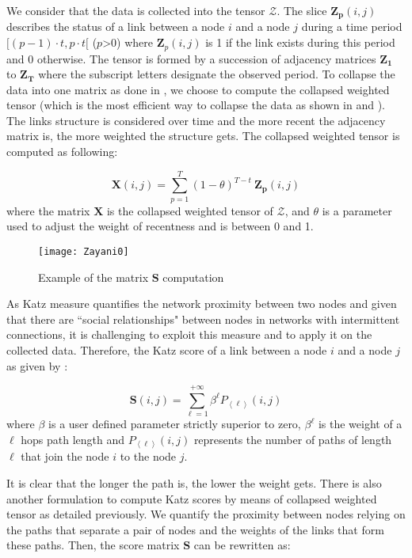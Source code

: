 \documentclass[conference]{IEEEtran}
\begin{document}
We consider that the data is collected into the tensor
$\boldsymbol{\mathcal{Z}}$. The slice $\mathbf{Z_{p}}(i, j)$
describes the status of a link between a node $i$ and a node $j$
during a time period $[(p-1) \cdot t,p \cdot t[$ ($p$>0) where
$\mathbf{Z}_{p}(i, j)$ is 1 if the link exists during this period
and 0 otherwise. The tensor is formed by a succession of adjacency
matrices $\mathbf{Z_{1}}$ to $\mathbf{Z_{T}}$ where the subscript
letters designate the observed period. To collapse the data into one
matrix as done in \cite{Acar2009,Dunlavy2011}, we choose to compute
the collapsed weighted tensor (which is the most efficient way to
collapse the data as shown in \cite{Acar2009} and
\cite{Dunlavy2011}). The links structure is considered over time and
the more recent the adjacency matrix is, the more weighted the
structure gets. The collapsed weighted tensor is computed as
following:

\begin{equation}
    \mathbf{X}(i,j)=\sum_{p=1}^{T} (1-\theta)^{T-t}\ \mathbf{Z_{p}}(i,j)
    \label{eq1}
\end{equation}
where the matrix $\mathbf{X}$ is the collapsed weighted tensor of
$\boldsymbol{\mathcal{Z}}$, and $\theta$ is a parameter used to
adjust the weight of recentness and is between 0 and 1.

\begin{figure}[!tb]
    \centering
    \texttt{[image: Zayani0]}
    \caption{Example of the matrix $\mathbf{S}$ computation}
    \label{Zayani0}
\end{figure}

As Katz measure quantifies the network proximity between two nodes
and given that there are ``social relationships" between nodes in
networks with intermittent connections, it is challenging to exploit
this measure and to apply it on the collected data. Therefore, the
Katz score of a link between a node $i$ and a node $j$ as given by
\cite{Katz1953}:

\begin{equation}
    \mathbf{S}(i,j)=\sum_{\ell=1}^{+\infty} \beta^{\ell} P_{\left \langle \ell  \right \rangle}(i,j)
    \label{eq2}
\end{equation}
where $\beta$ is a user defined parameter strictly superior to zero,
$\beta^{\ell}$ is the weight of a $\ell$ hops path length and
$P_{\left \langle \ell  \right \rangle}(i,j)$ represents the number
of paths of length $\ell$ that join the node $i$ to the node $j$.

It is clear that the longer the path is, the lower the weight gets.
There is also another formulation to compute Katz scores by means of
collapsed weighted tensor as detailed previously. We quantify the
proximity between nodes relying on the paths that separate a pair of
nodes and the weights of the links that form these paths. Then, the
score matrix $\mathbf{S}$ can be rewritten as:
\end{document}
